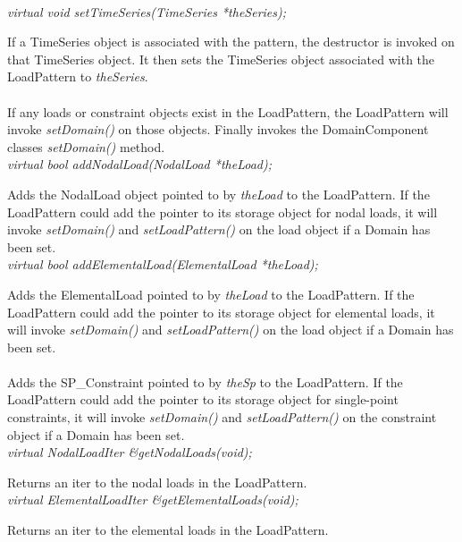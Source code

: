  \\
{\em virtual void setTimeSeries(TimeSeries *theSeries);}

If a TimeSeries object is associated with the pattern, the destructor
is invoked on that TimeSeries object. It then sets the TimeSeries object
associated with the LoadPattern to {\em theSeries}. \\

\\ 
If any loads or constraint objects exist in the LoadPattern, the
LoadPattern will invoke {\em setDomain()} on those objects. Finally
invokes the DomainComponent classes {\em setDomain()} method. \\

{\em  virtual bool addNodalLoad(NodalLoad *theLoad);}

Adds the NodalLoad object pointed to by {\em theLoad} to the
LoadPattern. If the LoadPattern could add the pointer to its storage
object for nodal loads, it will invoke {\em setDomain()}
and {\em setLoadPattern()} on the load object if a Domain has been set. \\

{\em  virtual bool addElementalLoad(ElementalLoad *theLoad);}

Adds the ElementalLoad pointed to by {\em theLoad} to the
LoadPattern. If the LoadPattern could add the pointer to its storage
object for elemental loads, it will invoke {\em setDomain()}
and {\em setLoadPattern()} on the load object if a Domain has been set. \\

\\ 
Adds the SP\_Constraint pointed to by {\em theSp} to the
LoadPattern. If the LoadPattern could add the pointer to its storage
object for single-point constraints, it will invoke {\em setDomain()}
and {\em setLoadPattern()} on the constraint object if a Domain has
been set. \\

{\em  virtual NodalLoadIter     \&getNodalLoads(void);}

Returns an iter to the nodal loads in the LoadPattern. \\

{\em  virtual ElementalLoadIter \&getElementalLoads(void);}

Returns an iter to the elemental loads in the LoadPattern. \\

